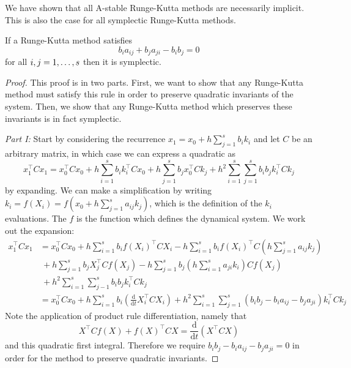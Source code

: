 We have shown that all A-stable Runge-Kutta methods are necessarily implicit.
This is also the case for all symplectic Runge-Kutta methods.

\begin{theorem}
\label{thm:symrk}
If a Runge-Kutta method satisfies
\begin{equation}
	b_i a_{ij} + b_j a_{ji} - b_i b_j = 0
\end{equation}
for all $i, j = 1, \mathellipsis, s$ then it is symplectic.
\end{theorem}
\begin{proof}

This proof is in two parts. First, we want to show that any Runge-Kutta method must satisfy this rule in order to preserve quadratic invariants of the system.
Then, we show that any Runge-Kutta method which preserves these invariants is in fact symplectic.

\textit{Part I:}
Start by considering the recurrence $x_1 = x_0 + h \sum_{j=1}^{s} b_i k_i$ and let $C$ be an arbitrary matrix, in which case we can express a quadratic as
\begin{equation}
	x_1^\intercal C x_1 = x_0^\intercal C x_0 + h \sum_{i=1}^{s} b_i k_i^\intercal C x_0 + h \sum_{j=1}^{s} b_j x_0^\intercal C k_j + h^2 \sum_{i=1}^{s} \sum_{j=1}^{s} b_i b_j k_i^\intercal C k_j
\end{equation} %
by expanding. We can make a simplification by writing $k_i = f(X_i) = f\left(x_0 + h \sum_{j=1}^{s}a_{ij}k_j\right)$, which is the definition of the $k_i$ evaluations.
The $f$ is the function which defines the dynamical system.
We work out the expansion:
\begin{align*}
	x_1^\intercal C x_1 &= x_0^\intercal C x_0 + h \sum_{i = 1}^{s} b_i f(X_i)^\intercal C X_i - h \sum_{i=1}^{s}b_i f(X_i)^\intercal C \left( h\sum_{j=1}^{s}a_{ij} k_j \right) \\
	&~ +h \sum_{j = 1}^{s} b_j X_j^\intercal C f(X_j) - h \sum_{j=1}^{s}b_j \left( h\sum_{i=1}^{s}a_{ji} k_i \right) C f(X_j) \\
	&~ + h^2 \sum_{i=1}^{s} \sum_{j-1}^{s} b_i b_j k_i^\intercal C k_j \\
	&= x_0^\intercal C x_0 + h \sum_{i=1}^{s} b_i \left(
		\frac{\mathrm{d}}{\mathrm{d}t} X_i^\intercal C X_i
	\right) + h^2 \sum_{i=1}^{s} \sum_{j=1}^{s} (b_i b_j - b_i a_{ij} - b_j a_{ji})k_i^\intercal C k_j
\end{align*}
Note the application of product rule differentiation, namely that
\begin{equation*}
	X^\intercal C f(X) + f(X)^\intercal C X = \frac{\mathrm{d}}{\mathrm{d}t} (X^\intercal C X)
\end{equation*}
and this quadratic first integral.
Therefore we require $b_i b_j - b_i a_{ij} - b_j a_{ji} = 0$ in order for the method to preserve quadratic invariants.


\end{proof}
